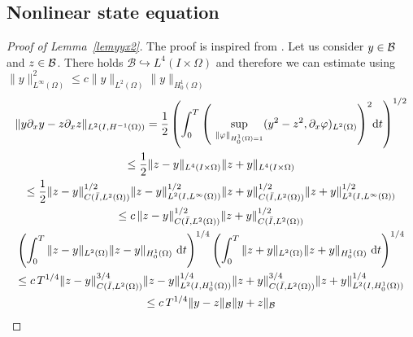 \subsection{Nonlinear state equation}
\label{sec:nonl-state-equat}
\begin{proof}[Proof of Lemma~\ref{lemyyx2}] The proof is inspired from \cite[Theorem 2.8]{faminskii2010initial}. Let us consider $y \in \mathcal{B}$ and $z \in \mathcal{B}$. There holds $\mathcal B\hookrightarrow L^4(I\times \Omega)$ and therefore we can estimate using $\|y\|_{L^\infty(\Omega)}^2\leq c\|y\|_{L^2(\Omega)}\|y\|_{H^1_0(\Omega)}$
\begin{multline*}
\norm{y\partial_x y - z\partial_x z}_{\Hm1}= \frac 1 2\left(\int_0^T{\left(\ \sup_{\norm{\varphi}_{H^1_0(\Omega) = 1}}(y^2 -  z^2,\partial_x\varphi)_{L^2(\Omega)}\right)^2}\mathrm dt\right)^{1/2} \\
\leq \frac{1}{2}\norm{z-y}_{L^4(I\times \Omega)}\norm{z+y}_{L^4(I\times \Omega)}\\
\leq\frac{1}{2} \norm{z-y}_{C(\bar I,L^2(\Omega))}^{1/2}\norm{z-y}_{L^2(I,L^{\infty}(\Omega))}^{1/2}\norm{z+y}_{C(\bar I,L^2(\Omega))}^{1/2}\norm{z+y}_{L^2(I,L^{\infty}(\Omega))}^{1/2}\\
\leq c\, \norm{z-y}_{C(\bar I,L^2(\Omega))}^{1/2}\norm{z+y}_{C(\bar I,L^2(\Omega))}^{1/2}\\
\left(\int_0^T{ \norm{z-y}_{L^2(\Omega)}\norm{z-y}_{H^1_0(\Omega)}~\mathrm dt}\right)^{1/4}\left(\int_0^T{ \norm{z+y}_{L^2(\Omega)}\norm{z+y}_{H^1_0(\Omega)}~\mathrm dt}\right)^{1/4}\\
\leq c \,T^{1/4}\norm{z-y}_{C(\bar I,L^2(\Omega))}^{3/4}\norm{z-y}_{L^2(I,H^1_0(\Omega))}^{1/4}\norm{z+y}_{C(\bar I,L^2(\Omega))}^{3/4}\norm{z+y}_{L^2(I,H^1_0(\Omega))}^{1/4} \\
\leq c \,T^{1/4}\norm{y-z}_{\B}\norm{y+z}_{\B}
\end{multline*}
\qquad\end{proof}

